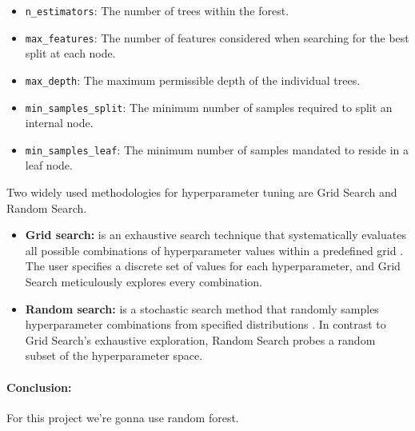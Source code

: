 \begin{itemize}
    \item \texttt{n\_estimators}: The number of trees within the forest.
    \item \texttt{max\_features}: The number of features considered when searching for the best split at each node.
    \item \texttt{max\_depth}: The maximum permissible depth of the individual trees.
    \item \texttt{min\_samples\_split}: The minimum number of samples required to split an internal node.
    \item \texttt{min\_samples\_leaf}: The minimum number of samples mandated to reside in a leaf node.
\end{itemize}

Two widely used methodologies for hyperparameter tuning are Grid Search and Random Search.

\begin{itemize}
	\item \textbf{Grid search:} is an exhaustive search technique that systematically evaluates all possible combinations of hyperparameter values within a predefined grid \cite{bergstra2012random}.
	The user specifies a discrete set of values for each hyperparameter, and Grid Search meticulously explores every combination.

	\item \textbf{Random search:} is a stochastic search method that randomly samples hyperparameter combinations from specified distributions \cite{bergstra2012random}.
	In contrast to Grid Search's exhaustive exploration, Random Search probes a random subset of the hyperparameter space.
\end{itemize}

\paragraph{Conclusion:} For this project we're gonna use random forest.
